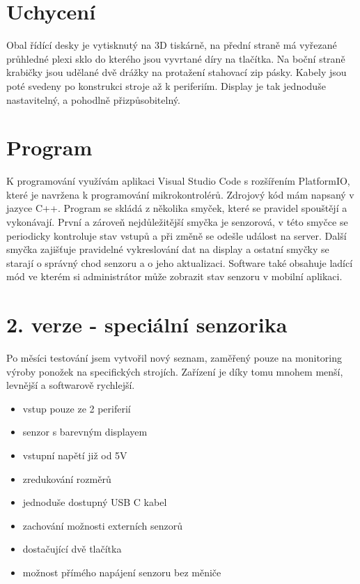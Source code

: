 \section{Uchycení}
Obal řídící desky je vytisknutý na 3D tiskárně, na přední straně má vyřezané průhledné plexi sklo do kterého jsou vyvrtané díry na tlačítka.
\fxnote[author=JA]{\textcolor{mygreen}{Překopat :-)}}
Na boční straně krabičky jsou udělané dvě drážky na protažení stahovací zip pásky. Kabely jsou poté svedeny po konstrukci stroje až k periferiím.
Display je tak jednoduše nastavitelný, a pohodlně přizpůsobitelný.


\section{Program}
K programování využívám aplikaci Visual Studio Code s rozšířením PlatformIO, které je navržena k programování mikrokontrolérů. 
Zdrojový kód mám napsaný v jazyce C++.
Program se skládá z několika smyček, které se pravidel spouštějí a vykonávají.
První a zároveň nejdůležitější smyčka je senzorová, v této smyčce se periodicky kontroluje stav vstupů a při změně se odešle událost na server.
Další smyčka zajišťuje pravidelné vykreslování dat na display a ostatní smyčky se starají o správný chod senzoru a o jeho aktualizaci.
Software také obsahuje ladící mód ve kterém si administrátor může zobrazit stav senzoru v mobilní aplikaci. 


\fxnote[author=JA]{\textcolor{mygreen}{Obrázek deksa => krabička}}

\newpage

\section{2. verze - speciální senzorika}

Po měsíci testování jsem vytvořil nový seznam, zaměřený pouze na monitoring výroby ponožek na specifických strojích.
Zařízení je díky tomu mnohem menší, levnější a softwarově rychlejší.

\begin{itemize}
    \item vstup pouze ze 2 periferií
    \item senzor s barevným displayem
    \item vstupní napětí již od 5V
    \item zredukování rozměrů
    \item jednoduše dostupný USB C kabel
    \item zachování možnosti externích senzorů
    \item dostačující dvě tlačítka
    \item možnost přímého napájení senzoru bez měniče
\end{itemize}

